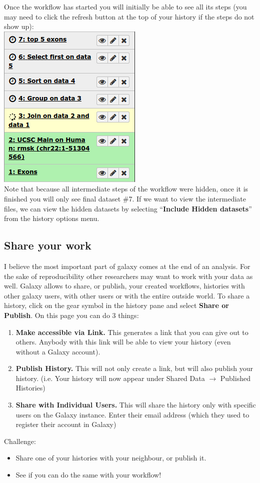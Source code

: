 \documentclass[11pt,a4paper]{article}
\begin{document}
Once the workflow has started you will initially be able to see all its steps (you may need to click the refresh button at the top of your history if the steps do not show up):\\
\includegraphics[scale=0.55]{figures/101_39}\\
Note that because all intermediate steps of the workflow were hidden, once it is finished you will only see final dataset \#7. If we want to view the intermediate files, we can view the hidden datasets by selecting ``\textbf{Include Hidden datasets}'' from the history options menu.
\subsection{Share your work}
I believe the most important part of galaxy comes at the end of an analysis. For the sake of reproducibility other researchers may want to work with your data as well. Galaxy allows to share, or publish, your created workflows, histories with other galaxy users, with other users or with the entire outside world. To share a history, click on the gear symbol in the history pane and select \textbf{Share or Publish}. On this page you can do 3 things:
\begin{enumerate}
	\item \textbf{Make accessible via Link.} This generates a link that you can give out to others. Anybody with this link will be able to view your history (even without a Galaxy account).
	\item \textbf{Publish History.} This will not only create a link, but will also publish your history. (i.e. Your history will now appear
 under Shared Data $\rightarrow$ Published Histories)
	\item \textbf{Share with Individual Users.} This will share the history only with specific users on the Galaxy instance. Enter their email address (which they used to register their account in Galaxy)
\end{enumerate}

Challenge:
\begin{itemize}
	\item Share one of your histories with your neighbour, or publish it.
	\item See if you can do the same with your workflow!
\end{itemize}

%
%


\vspace{-1.5em}

\end{document}
